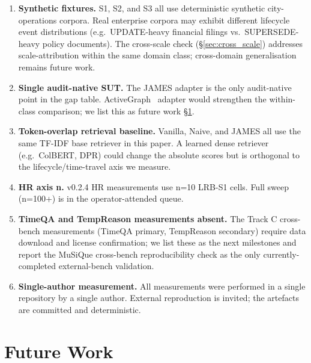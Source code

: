 \documentclass[11pt,a4paper]{article}
\begin{document}
\begin{enumerate}[leftmargin=*]
  \item \textbf{Synthetic fixtures.} S1, S2, and S3 all use deterministic synthetic city-operations corpora. Real enterprise corpora may exhibit different lifecycle event distributions (e.g.~UPDATE-heavy financial filings vs.~SUPERSEDE-heavy policy documents). The cross-scale check (\S\ref{sec:cross_scale}) addresses scale-attribution within the same domain class; cross-domain generalisation remains future work.
  \item \textbf{Single audit-native SUT.} The JAMES adapter is the only audit-native point in the gap table. ActiveGraph~\cite{nakajima2026activegraph} adapter would strengthen the within-class comparison; we list this as future work \S\ref{sec:future}.
  \item \textbf{Token-overlap retrieval baseline.} Vanilla, Naive, and JAMES all use the same TF-IDF base retriever in this paper. A learned dense retriever (e.g.~ColBERT, DPR) could change the absolute scores but is orthogonal to the lifecycle/time-travel axis we measure.
  \item \textbf{HR axis n.} v0.2.4 HR measurements use n=10 LRB-S1 cells. Full sweep (n=100+) is in the operator-attended queue.
  \item \textbf{TimeQA and TempReason measurements absent.} The Track C cross-bench measurements (TimeQA primary, TempReason secondary) require data download and license confirmation; we list these as the next milestones and report the MuSiQue cross-bench reproducibility check as the only currently-completed external-bench validation.
  \item \textbf{Single-author measurement.} All measurements were performed in a single repository by a single author. External reproduction is invited; the artefacts are committed and deterministic.
\end{enumerate}

\section{Future Work}
\label{sec:future}
\end{document}
